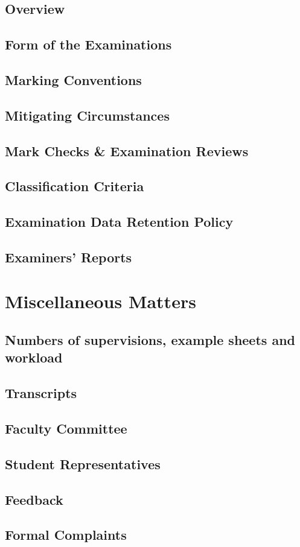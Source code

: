 \begin{multicols}{2}
  \subsection{Overview}
    \lipsum[1-2]
  \subsection{Form of the Examinations}
    \lipsum[3-4]
  \subsection{Marking Conventions}
    \lipsum[1-2]
  \subsection{Mitigating Circumstances}
    \lipsum[3-4]
  \subsection{Mark Checks \& Examination Reviews}
    \lipsum[1-2]
  \subsection{Classification Criteria}
    \lipsum[3-4]
  \subsection{Examination Data Retention Policy}
    \lipsum[2]
  \subsection{Examiners' Reports}
    \lipsum[3-4]

\section{Miscellaneous Matters}
  \subsection{Numbers of supervisions, example sheets and workload}
    \lipsum[6]
  \subsection{Transcripts}
    \lipsum[1-2]
  \subsection{Faculty Committee}
    \lipsum[3-4]
  \subsection{Student Representatives}
    \lipsum[2]
  \subsection{Feedback}
    \lipsum[3-4]
  \subsection{Formal Complaints}
    \lipsum[5-6]
    
\vfill\null\pagebreak
\end{multicols}